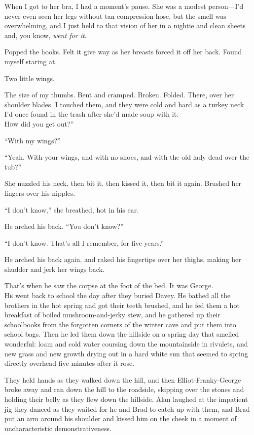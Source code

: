 When I got to her bra, I had a moment's pause.  She was a modest
person---I'd never even seen her legs without tan compression hose,
but the smell was overwhelming, and I just held to that vision of her
in a nightie and clean sheets and, you know, \textit{went for it}.

Popped the hooks.  Felt it give way as her breasts forced it off her
back.  Found myself staring at.

Two little wings.

The size of my thumbs.  Bent and cramped.  Broken.  Folded.  There,
over her shoulder blades.  I touched them, and they were cold and hard
as a turkey neck I'd once found in the trash after she'd made soup
with it.
\\
\lettrine[lines=3, lhang=.5, nindent=0pt, findent=2pt]{H}{ow}
did you get out?''

``With my wings?''

``Yeah.  With your wings, and with no shoes, and with the old lady
dead over the tub?''

She nuzzled his neck, then bit it, then kissed it, then bit it again. 
Brushed her fingers over his nipples.

``I don't know,'' she breathed, hot in his ear.

He arched his back.  ``You don't know?''

``I don't know.  That's all I remember, for five years.''

He arched his back again, and raked his fingertips over her thighs,
making her shudder and jerk her wings back.

That's when he saw the corpse at the foot of the bed.  It was George.
\\
\lettrine[lines=3, lhang=.5, nindent=0pt, findent=2pt]{H}{e} went back to school the day after they buried Davey.  He bathed all
the brothers in the hot spring and got their teeth brushed, and he fed
them a hot breakfast of boiled mushroom-and-jerky stew, and he
gathered up their schoolbooks from the forgotten corners of the winter
cave and put them into school bags.  Then he led them down the
hillside on a spring day that smelled wonderful:  loam and cold water
coursing down the mountainside in rivulets, and new grass and new
growth drying out in a hard white sun that seemed to spring directly
overhead five minutes after it rose.

They held hands as they walked down the hill, and then
Elliot-Franky-George broke away and ran down the hill to the roadside,
skipping over the stones and holding their belly as they flew down the
hillside.  Alan laughed at the impatient jig they danced as they
waited for he and Brad to catch up with them, and Brad put an arm
around his shoulder and kissed him on the cheek in a moment of
uncharacteristic demonstrativeness.

